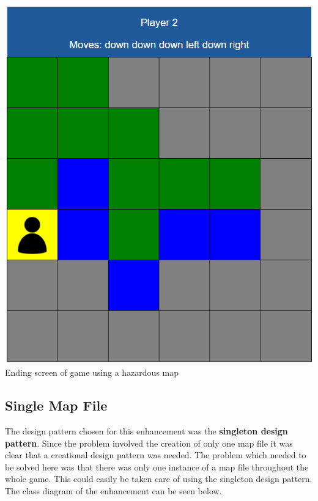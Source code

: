 \documentclass[a4paper,12pt]{extarticle}
\begin{document}
\begin{center}
\includegraphics[scale=0.5]{Figure3.png}\\
Ending screen of game using a hazardous map
\end{center}

\newpage

\subsection{Single Map File}

The design pattern chosen for this enhancement was the \textbf{singleton design pattern}. Since the problem involved the creation of only one map file it was clear that a creational design pattern was needed. The problem which needed to be solved here was that there was only one instance of a map file throughout the whole game. This could easily be taken care of using the singleton design pattern.\\

\noindent The class diagram of the enhancement can be seen below.\\
\end{document}
